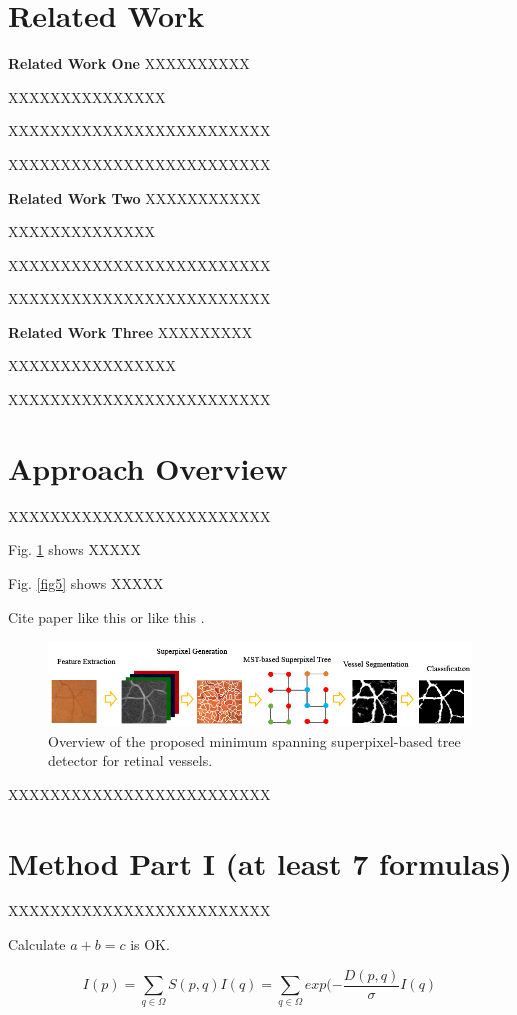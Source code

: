 \documentclass[journal]{IEEEtran}
\begin{document}
\section{Related Work}
\textbf{Related Work One} XXXXXXXXXX

XXXXXXXXXXXXXXX

XXXXXXXXXXXXXXXXXXXXXXXXX

XXXXXXXXXXXXXXXXXXXXXXXXX

\textbf{Related Work Two} XXXXXXXXXXX

XXXXXXXXXXXXXX

XXXXXXXXXXXXXXXXXXXXXXXXX

XXXXXXXXXXXXXXXXXXXXXXXXX

\textbf{Related Work Three} XXXXXXXXX

XXXXXXXXXXXXXXXX

XXXXXXXXXXXXXXXXXXXXXXXXX


\section{Approach Overview}
XXXXXXXXXXXXXXXXXXXXXXXXX

Fig. \ref{fig1} shows XXXXX

Fig. \ref{fig5} shows XXXXX

Cite paper like this \cite{Chaudhuri_1989} or like this \cite{Chaudhuri_1989,Li_2014}.

\begin{figure}
\centering
\footnotesize
\centerline{\includegraphics[width=0.9\linewidth]{Fig1.jpg}}
\caption{Overview of the proposed minimum spanning superpixel-based tree detector for retinal vessels.}
\label{fig1}
\end{figure}

XXXXXXXXXXXXXXXXXXXXXXXXX

\section{Method Part I (at least 7 formulas)}
XXXXXXXXXXXXXXXXXXXXXXXXX

Calculate $a+b=c$ is OK.

\begin{equation} \label{Eq_1}
I(p)= \sum_{q\in\Omega}S(p,q)I(q)=\sum_{q\in\Omega}exp(-\frac{D(p,q)}{\sigma}I(q)
\end{equation}
\end{document}
